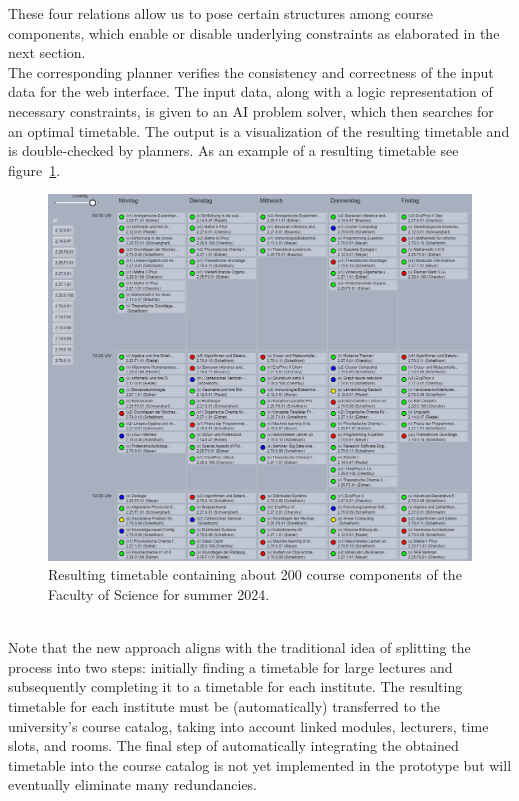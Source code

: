 \documentclass{easychair}
\begin{document}
  These four relations allow us to pose certain structures among course components, which enable or disable underlying constraints as elaborated in the next section. \\ 
  The corresponding planner verifies the consistency and correctness of the input data for the web interface. 
  The input data, along with a logic representation of necessary constraints, is given to an AI problem solver, which then searches for an optimal timetable. 
  The output is a visualization of the resulting timetable and is double-checked by planners. 
  As an example of a resulting timetable see figure~\ref{fig:timetable}. 
  \begin{figure}
    \includegraphics[width=\linewidth]{timetable}
    \caption{Resulting timetable containing about 200 course components of the Faculty of Science for summer 2024.}
    \label{fig:timetable}
  \end{figure} \\
  Note that the new approach aligns with the traditional idea of splitting the process into two steps: initially finding a timetable for large lectures and subsequently completing it to a timetable for each institute.
  The resulting timetable for each institute must be (automatically) transferred to the university's course catalog, taking into account linked modules, lecturers, time slots, and rooms.
  The final step of automatically integrating the obtained timetable into the course catalog is not yet implemented in the prototype but will eventually eliminate many redundancies.
\end{document}
